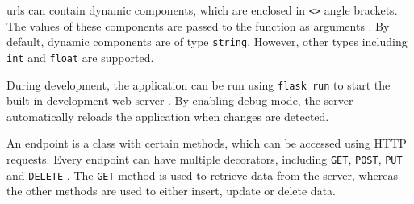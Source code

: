\acp{url} can contain dynamic components, which are enclosed in \texttt{<>} angle brackets.
The values of these components are passed to the function as arguments \cite{flask_book2018}.
By default, dynamic components are of type \texttt{string}.
However, other types including \texttt{int} and \texttt{float} are supported.

During development, the \flask{} application can be run using \texttt{flask run} to start the built-in development web server \cite{flask_book2018}.
By enabling debug mode, the server automatically reloads the application when changes are detected.

An endpoint is a class with certain methods, which can be accessed using HTTP requests.
Every endpoint can have multiple decorators, including \texttt{GET}, \texttt{POST}, \texttt{PUT} and \texttt{DELETE} \cite{flask2018}.
The \texttt{GET} method is used to retrieve data from the server, whereas the other methods are used to either insert, update or delete data.
